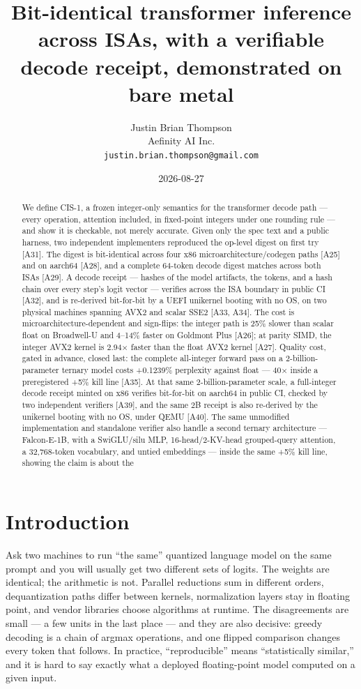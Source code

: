 \documentclass[11pt]{article}
\title{\textbf{Bit-identical transformer inference across ISAs, with a verifiable decode receipt, demonstrated on bare metal}}
\author{Justin Brian Thompson \\ Aefinity AI Inc. \\ \texttt{justin.\allowbreak{}brian.\allowbreak{}thompson@gmail.\allowbreak{}com}}
\date{2026-08-27}
\begin{document}
\maketitle

\begin{abstract}
We define CIS-1, a frozen integer-only semantics for the transformer decode path --- every
operation, attention included, in fixed-point integers under one rounding rule --- and show it is
checkable, not merely accurate. Given only the spec text and a public harness, two independent
implementers reproduced the op-level digest on first try {[}A31{]}. The digest is bit-identical across
four x86 microarchitecture/codegen paths {[}A25{]} and on aarch64 {[}A28{]}, and a complete 64-token decode
digest matches across both ISAs {[}A29{]}. A decode receipt --- hashes of the model artifacts, the
tokens, and a hash chain over every step's logit vector --- verifies across the ISA boundary in
public CI {[}A32{]}, and is re-derived bit-for-bit by a UEFI unikernel booting with no OS, on two
physical machines spanning AVX2 and scalar SSE2 {[}A33, A34{]}. The cost is microarchitecture-dependent
and sign-flips: the integer path is 25\% slower than scalar float on Broadwell-U and 4--14\% faster on
Goldmont Plus {[}A26{]}; at parity SIMD, the integer AVX2 kernel is 2.94× faster than the float AVX2
kernel {[}A27{]}. Quality cost, gated
in advance, closed last: the complete all-integer forward pass on a 2-billion-parameter ternary
model costs +0.1239\% perplexity against float --- 40× inside a preregistered +5\% kill line {[}A35{]}. At
that same 2-billion-parameter scale, a full-integer decode receipt minted on x86 verifies
bit-for-bit on aarch64 in public CI, checked by two independent verifiers {[}A39{]}, and the same 2B
receipt is also re-derived by the unikernel booting with no OS, under QEMU {[}A40{]}. The same
unmodified implementation and standalone verifier also handle a second ternary architecture ---
Falcon-E-1B, with a SwiGLU/silu MLP, 16-head/2-KV-head grouped-query attention, a 32,768-token
vocabulary, and untied embeddings --- inside the same +5\% kill line, showing the claim is about the
\end{abstract}

\section{Introduction}\label{introduction}

Ask two machines to run ``the same'' quantized language model on the same prompt and you will
usually get two different sets of logits. The weights are identical; the arithmetic is not.
Parallel reductions sum in different orders, dequantization paths differ between kernels,
normalization layers stay in floating point, and vendor libraries choose algorithms at runtime.
The disagreements are small --- a few units in the last place --- and they are also decisive: greedy
decoding is a chain of argmax operations, and one flipped comparison changes every token that
follows. In practice, ``reproducible'' means ``statistically similar,'' and it is hard to say exactly
what a deployed floating-point model computed on a given input.
\end{document}
